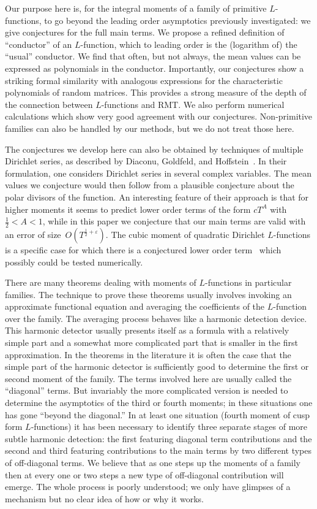 \documentclass[12pt,letterpaper]{amsart}
\theoremstyle{plain}
\theoremstyle{definition}
\theoremstyle{remark}
\numberwithin{equation}{subsection}
\numberwithin{theorem}{subsection}
\numberwithin{table}{subsection}
\begin{document}
Our purpose here is, for the integral moments of a family of
primitive $L$-functions, to go beyond
the leading order asymptotics previously investigated: we
give conjectures for the full main terms.
We propose a refined definition of ``conductor'' of an $L$-function,
which to leading order is the (logarithm of) the ``usual'' conductor.
We find that often, but not always, the mean values can be
expressed as polynomials in the conductor.
Importantly, our conjectures show a striking formal
similarity with analogous expressions for the
characteristic polynomials of random matrices.  This
provides a strong measure of the depth of the connection
between $L$-functions and RMT.  We also perform numerical
calculations which show very good agreement with our
conjectures.  Non-primitive families can also
be handled by our methods, but we do not treat those here.

The conjectures we develop here can also be obtained by
techniques of multiple Dirichlet
series, as described by Diaconu, Goldfeld,
and Hoffstein~\cite{DGH}.  In their formulation, one
considers Dirichlet series in several complex variables.
The mean values we conjecture would then follow from
a plausible conjecture about the polar divisors of the
function.  An interesting feature of their approach is that
for higher moments it seems to predict  lower order terms
of the form $c T^A$ with $\frac12<A<1$, while in this paper
we conjecture that our main terms are valid with an error
of size~$O(T^{\frac12+\varepsilon})$.  The cubic moment
of quadratic Dirichlet $L$-functions is a specific case
for which there is a conjectured lower order term~\cite{Z}
which possibly could be tested numerically.

There are many theorems dealing with moments of $L$-functions in
particular families.  The technique to prove these theorems usually
involves invoking an approximate functional equation and averaging
the coefficients of the $L$-function over the family. The averaging process
behaves like a harmonic detection device. This harmonic detector usually
presents itself as a formula with a relatively simple part and a somewhat
more complicated part that is smaller in the first approximation.
In the theorems in the literature it is often the case that the simple
part of the harmonic detector is sufficiently good to determine the first
or second moment of the family. The terms involved here are usually
called the ``diagonal'' terms. But invariably the more complicated
version is needed to determine the asymptotics of the third or fourth
moments; in these situations one has gone ``beyond the diagonal.''
In at least one situation (fourth moment of cusp form $L$-functions)
it has been necessary to identify three separate stages of more subtle
harmonic detection: the first featuring diagonal term contributions and
the second and third featuring contributions to the main terms by two
different types of off-diagonal terms.  We believe that as one steps up
the moments of a family then at every one or two steps a new type of
off-diagonal contribution will emerge. The whole process is poorly
understood; we only have glimpses of a mechanism but no clear idea of how
or why it works.
\end{document}
